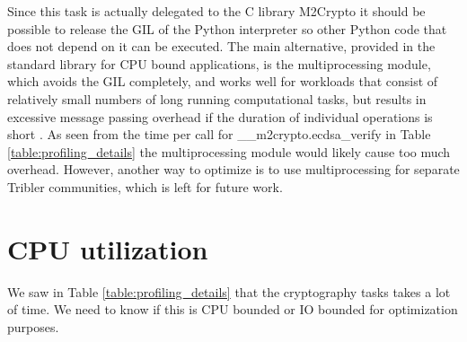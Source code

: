 Since this task is actually delegated to the C library M2Crypto it should be possible to release the GIL of the Python interpreter so other Python code that does not depend on it can be executed.
The main alternative, provided in the standard library for CPU bound applications, is the multiprocessing module, which avoids the GIL completely, and works well for workloads that consist of relatively small numbers of long running computational tasks, but results in excessive message passing overhead if the duration of individual operations is short \cite{multicore_python}.
As seen from the time per call for \_\_m2crypto.ecdsa\_verify in Table \ref{table:profiling_details} the multiprocessing module would likely cause too much overhead.
However, another way to optimize is to use multiprocessing for separate Tribler communities, which is left for future work.


\section{CPU utilization}\label{sec:cpu_utilization}
We saw in Table \ref{table:profiling_details} that the cryptography tasks takes a lot of time.
We need to know if this is CPU bounded or IO bounded for optimization purposes.


